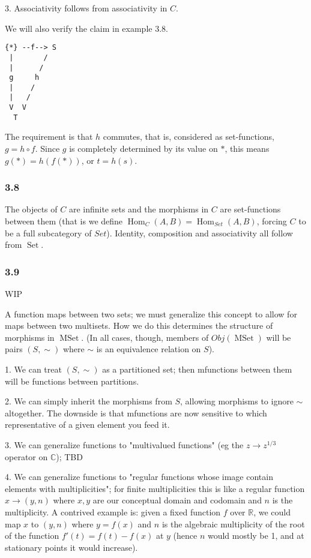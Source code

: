 \documentclass{article}
\DeclareMathOperator{\Hom}{Hom}
\DeclareMathOperator{\Set}{Set}
\DeclareMathOperator{\MSet}{MSet}
\def\R{\mathbb{R}}
\def\C{\mathbb{C}}
\begin{document}
3. Associativity follows from associativity in $C$.

We will also verify the claim in example 3.8.

\begin{verbatim}
{*} --f--> S
 |       /
 |      /
 g     h
 |    /
 |   /
 V  V
  T
\end{verbatim}

The requirement is that $h$ commutes, that is, considered as set-functions, $g = h \circ f$. Since $g$ is completely determined by its value on $*$, this means $g(*) = h(f(*))$, or $t = h(s)$.

\subsubsection*{3.8}

The objects of $C$ are infinite sets and the morphisms in $C$ are set-functions between them (that is we define $\Hom_C(A, B) = \Hom_{Set}(A, B)$, forcing $C$ to be a full subcategory of $Set$). Identity, composition and associativity all follow from $\Set$.

\subsubsection*{3.9}

WIP

A function maps between two sets; we must generalize this concept to allow for maps between two multisets. How we do this determines the structure of morphisms in $\MSet$. (In all cases, though, members of $Obj(\MSet)$ will be pairs $(S, \sim)$ where $\sim$ is an equivalence relation on $S$).

1. We can treat $(S, \sim)$ as a partitioned set; then mfunctions between them will be functions between partitions.

2. We can simply inherit the morphisms from $S$, allowing morphisms to ignore $\sim$ altogether. The downside is that mfunctions are now sensitive to which representative of a given element you feed it.

3. We can generalize functions to "multivalued functions" (eg the $z \to z^{1/3}$ operator on $\C$); TBD

4. We can generalize functions to "regular functions whose image contain elements with multiplicities"; for finite multiplicities this is like a regular function $x \to (y, n)$ where $x, y$ are our conceptual domain and codomain and $n$ is the multiplicity. A contrived example is: given a fixed function $f$ over $\R$, we could map $x$ to $(y, n)$ where $y = f(x)$ and $n$ is the algebraic multiplicity of the root of the function $f'(t) = f(t) - f(x)$ at $y$ (hence $n$ would mostly be 1, and at stationary points it would increase).
\end{document}
